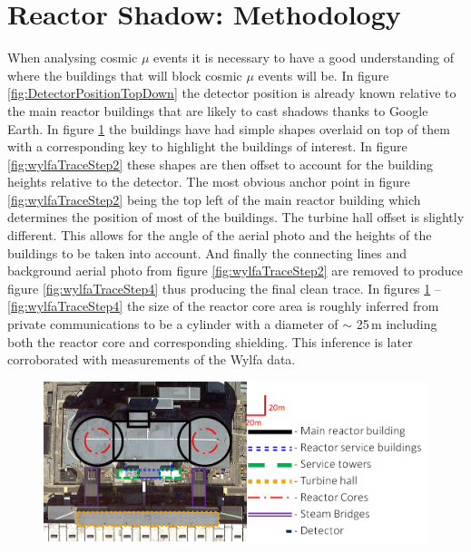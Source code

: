 \section{Reactor Shadow: Methodology} \label{sec:ReactorShadowMethodology}
When analysing cosmic $\mu$ events it is necessary to have a good understanding of where the buildings that will block cosmic $\mu$ events will be. In figure \ref{fig:DetectorPositionTopDown} the detector position is already known relative to the main reactor buildings that are likely to cast shadows thanks to Google Earth. In figure \ref{fig:wylfaTraceStep1} the buildings have had simple shapes overlaid on top of them with a corresponding key to highlight the buildings of interest. In figure \ref{fig:wylfaTraceStep2} these shapes are then offset to account for the building heights relative to the detector. The most obvious anchor point in figure \ref{fig:wylfaTraceStep2} being the top left of the main reactor building which determines the position of most of the buildings. The turbine hall offset is slightly different. This allows for the angle of the aerial photo and the heights of the buildings to be taken into account. And finally the connecting lines and background aerial photo from figure \ref{fig:wylfaTraceStep2} are removed to produce figure \ref{fig:wylfaTraceStep4} thus producing the final clean trace. In figures \ref{fig:wylfaTraceStep1}  -- \ref{fig:wylfaTraceStep4} the size of the reactor core area is roughly inferred from private communications to be a cylinder with a diameter of $\sim$ 25\,m including both the reactor core and corresponding shielding. This inference is later corroborated with measurements of the Wylfa data. 

\begin{figure}[htbp]
 \centering
 \includegraphics[width=\linewidth]{Chapter5/Figs/wylfaRasterNew/wylfaTraceStep1.png}
 \label{fig:wylfaTraceStep1}
\end{figure}

